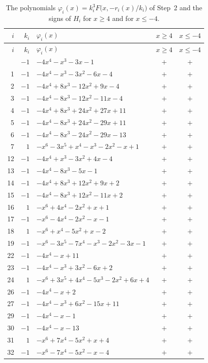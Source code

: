 \documentclass[11pt]{article}
\begin{document}
\begingroup\footnotesize
\setlength{\LTcapwidth}{\textwidth}
\begin{longtable}{@{}rrlcc@{}}
\caption{The polynomials $\varphi_i(x)=k_i^3F\bigl(x,-r_i(x)/k_i\bigr)$ of Step~2 and the signs of $H_i$ for $x\geq4$ and for $x\leq-4$.}\label{tab:phi}\\
\hline $i$ & $k_i$ & $\varphi_i(x)$ & $x\geq4$ & $x\leq-4$\\\hline\endfirsthead\hline $i$ & $k_i$ & $\varphi_i(x)$ & $x\geq4$ & $x\leq-4$\\\hline\endhead\hline\endfoot
0 & $-1$ & $-4x^{4}-x^{3}-3x-1$ & $+$ & $+$\\
1 & $-1$ & $-4x^{4}-x^{3}-3x^{2}-6x-4$ & $+$ & $+$\\
2 & $-1$ & $-4x^{4}+8x^{3}-12x^{2}+9x-4$ & $+$ & $+$\\
3 & $-1$ & $-4x^{4}-8x^{3}-12x^{2}-11x-4$ & $+$ & $+$\\
4 & $-1$ & $-4x^{4}+8x^{3}+24x^{2}+27x+11$ & $+$ & $+$\\
5 & $-1$ & $-4x^{4}-8x^{3}+24x^{2}-29x+11$ & $+$ & $+$\\
6 & $-1$ & $-4x^{4}-8x^{3}-24x^{2}-29x-13$ & $+$ & $+$\\
7 & $1$ & $-x^{6}-3x^{5}+x^{4}-x^{3}-2x^{2}-x+1$ & $+$ & $+$\\
12 & $-1$ & $-4x^{4}+x^{3}-3x^{2}+4x-4$ & $+$ & $+$\\
13 & $-1$ & $-4x^{4}-8x^{3}-5x-1$ & $+$ & $+$\\
14 & $-1$ & $-4x^{4}+8x^{3}+12x^{2}+9x+2$ & $+$ & $+$\\
15 & $-1$ & $-4x^{4}-8x^{3}+12x^{2}-11x+2$ & $+$ & $+$\\
16 & $1$ & $-x^{6}+4x^{4}-2x^{2}+x+1$ & $+$ & $+$\\
17 & $-1$ & $-x^{6}-4x^{4}-2x^{2}-x-1$ & $+$ & $+$\\
18 & $1$ & $-x^{6}+x^{4}-5x^{2}+x-2$ & $+$ & $+$\\
19 & $-1$ & $-x^{6}-3x^{5}-7x^{4}-x^{3}-2x^{2}-3x-1$ & $+$ & $+$\\
22 & $-1$ & $-4x^{4}-x+11$ & $+$ & $+$\\
23 & $-1$ & $-4x^{4}-x^{3}+3x^{2}-6x+2$ & $+$ & $+$\\
24 & $1$ & $-x^{6}+3x^{5}+4x^{4}-5x^{3}-2x^{2}+6x+4$ & $+$ & $+$\\
26 & $-1$ & $-4x^{4}-x+2$ & $+$ & $+$\\
27 & $-1$ & $-4x^{4}-x^{3}+6x^{2}-15x+11$ & $+$ & $+$\\
29 & $-1$ & $-4x^{4}-x-1$ & $+$ & $+$\\
30 & $-1$ & $-4x^{4}-x-13$ & $+$ & $+$\\
31 & $1$ & $-x^{6}+7x^{4}-5x^{2}+x+4$ & $+$ & $+$\\
32 & $-1$ & $-x^{6}-7x^{4}-5x^{2}-x-4$ & $+$ & $+$\\
\end{longtable}
\endgroup
\end{document}
